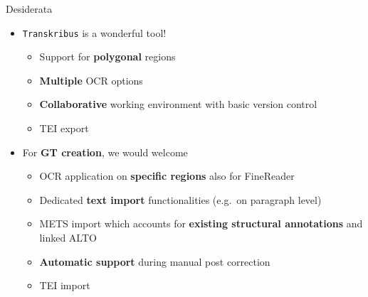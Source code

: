 \documentclass{bbawslides}
\begin{document}
\begin{bbawslide}{Desiderata}
  \vspace*{2mm}%
  \centerslidestrue%
  \begin{itemize}
    \item \texttt{Transkribus} is a wonderful tool!
    \begin{itemize}\small
      \item Support for \textbf{polygonal} regions
      \item \textbf{Multiple} OCR options
      \item \textbf{Collaborative} working environment with basic version control
      \item TEI export
    \end{itemize}
    \item For \textbf{GT creation}, we would welcome
    \begin{itemize}\small
      \item OCR application on \textbf{specific regions} also for FineReader
      \item Dedicated \textbf{text import} functionalities (e.g.~on paragraph level)
      \item METS import which accounts for \textbf{existing structural annotations} and linked ALTO
      \item \textbf{Automatic support} during manual post correction
      \item TEI import
    \end{itemize}
  \end{itemize}
\end{bbawslide}
\end{document}
